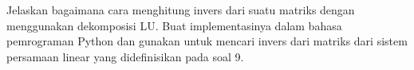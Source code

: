 Jelaskan bagaimana cara menghitung invers dari suatu matriks dengan menggunakan dekomposisi LU.
Buat implementasinya dalam bahasa pemrograman Python dan gunakan untuk mencari invers dari matriks dari
sistem persamaan linear yang didefinisikan pada soal 9.

